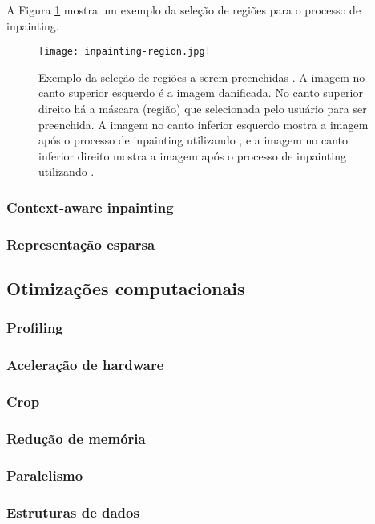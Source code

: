A Figura \ref{fig:inpainting-region} mostra um exemplo da seleção de regiões para o processo de inpainting.
\begin{figure}[ht]
\centering
\texttt{[image: inpainting-region.jpg]}
\caption{Exemplo da seleção de regiões a serem preenchidas \cite{OpenCVmessi}. A imagem no canto superior esquerdo é a imagem danificada. No canto superior direito há a máscara (região) que selecionada pelo usuário para ser preenchida. A imagem no canto inferior esquerdo mostra a imagem após o processo de inpainting utilizando \cite{Bertalmio2001navier}, e a imagem no canto inferior direito mostra a imagem após o processo de inpainting utilizando \cite{Telea2004}.}
\label{fig:inpainting-region}
\end{figure}

\subsubsection{Context-aware inpainting} \label{quality-context}
\subsubsection{Representação esparsa} \label{quality-sparse}



\subsection{Otimizações computacionais}
\subsubsection{Profiling} \label{time-prof}
\subsubsection{Aceleração de hardware} \label{time-acel}
\subsubsection{Crop} \label{time-crop}
\subsubsection{Redução de memória} \label{time-mem}
\subsubsection{Paralelismo} \label{time-par}
\subsubsection{Estruturas de dados} \label{time-struct}
